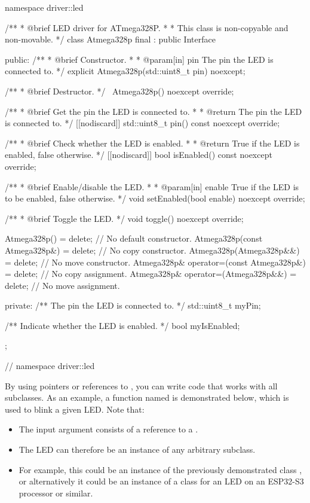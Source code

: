 \begin{cppcode}
namespace driver::led
{
/**
 * @brief LED driver for ATmega328P.
 *
 *        This class is non-copyable and non-movable.
 */
class Atmega328p final : public Interface
{
public:
    /**
     * @brief Constructor.
     *
     * @param[in] pin The pin the LED is connected to.
     */
    explicit Atmega328p(std::uint8_t pin) noexcept;

    /**
     * @brief Destructor.
     */
    ~Atmega328p() noexcept override;

    /**
     * @brief Get the pin the LED is connected to.
     *
     * @return The pin the LED is connected to.
     */
    [[nodiscard]] std::uint8_t pin() const noexcept override;

    /**
     * @brief Check whether the LED is enabled.
     *
     * @return True if the LED is enabled, false otherwise.
     */
    [[nodiscard]] bool isEnabled() const noexcept override;

    /**
     * @brief Enable/disable the LED.
     *
     * @param[in] enable True if the LED is to be enabled, false otherwise.
     */
    void setEnabled(bool enable) noexcept override;

    /**
     * @brief Toggle the LED.
     */
    void toggle() noexcept override;

    Atmega328p()                             = delete; // No default constructor.
    Atmega328p(const Atmega328p&)            = delete; // No copy constructor.
    Atmega328p(Atmega328p&&)                 = delete; // No move constructor.
    Atmega328p& operator=(const Atmega328p&) = delete; // No copy assignment.
    Atmega328p& operator=(Atmega328p&&)      = delete; // No move assignment.

private:
    /** The pin the LED is connected to. */
    std::uint8_t myPin;

    /** Indicate whether the LED is enabled. */
    bool myIsEnabled;
};
} // namespace driver::led
\end{cppcode}

\noindent By using pointers or references to , you can write code that
works with all subclasses. As an example, a function named  is demonstrated below,
which is used to blink a given LED. Note that:
\begin{itemize}
  \item The input argument  consists of a reference to a .
  \item The LED can therefore be an instance of any arbitrary subclass.
  \item For example, this could be an instance of the previously demonstrated class
    , or alternatively it could be an instance of a class for an LED
    on an ESP32-S3 processor or similar.
\end{itemize}

